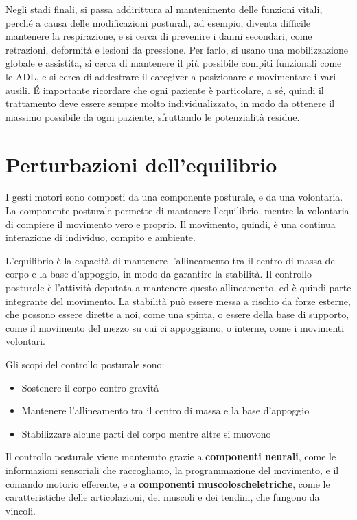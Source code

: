 Negli stadi finali, si passa addirittura al mantenimento delle funzioni vitali, 
perché a causa delle modificazioni posturali, ad esempio, diventa difficile 
mantenere la respirazione, e si cerca di prevenire i danni secondari, come 
retrazioni, deformità e lesioni da pressione. Per farlo, si usano una 
mobilizzazione globale e assistita, si cerca di mantenere il più possibile 
compiti funzionali come le ADL, e si cerca di addestrare il caregiver a 
posizionare e movimentare i vari ausili. \'E importante ricordare che ogni 
paziente è particolare, a sé, quindi il trattamento deve essere sempre molto 
individualizzato, in modo da ottenere il massimo possibile da ogni paziente, 
sfruttando le potenzialità residue.

\section{Perturbazioni dell'equilibrio}
I gesti motori sono composti da una componente posturale, e da una volontaria.
La componente posturale permette di mantenere l'equilibrio, mentre la volontaria
di compiere il movimento vero e proprio. Il movimento, quindi, è una continua
interazione di individuo, compito e ambiente.

L'equilibrio è la capacità di mantenere l'allineamento tra il centro di massa
del corpo e la base d'appoggio, in modo da garantire la stabilità. Il controllo
posturale è l'attività deputata a mantenere questo allineamento, ed è quindi
parte integrante del movimento.
La stabilità può essere messa a rischio da forze esterne, che possono essere
dirette a noi, come una spinta, o essere della base di supporto, come il
movimento del mezzo su cui ci appoggiamo, o interne, come i movimenti volontari.

Gli scopi del controllo posturale sono:
\begin{itemize}
\item Sostenere il corpo contro gravità
\item Mantenere l'allineamento tra il centro di massa e la base d'appoggio
\item Stabilizzare alcune parti del corpo mentre altre si muovono
\end{itemize}

Il controllo posturale viene mantenuto grazie a \textbf{componenti neurali},
come le informazioni sensoriali che raccogliamo, la programmazione del
movimento, e il comando motorio efferente, e a \textbf{componenti
muscoloscheletriche}, come le caratteristiche delle articolazioni, dei muscoli
e dei tendini, che fungono da vincoli.

